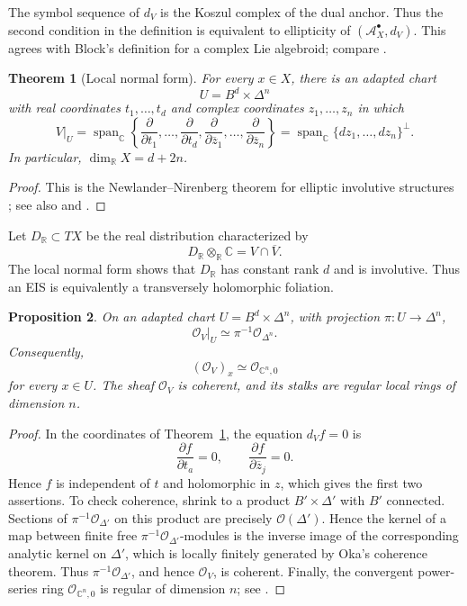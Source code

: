 \documentclass[12pt]{amsart}
\newtheorem{thm}{Theorem}[section]
\newtheorem{prop}[thm]{Proposition}
\theoremstyle{definition}
\theoremstyle{remark}
\numberwithin{equation}{section}
\newcommand{\CA}{\mathcal A}
\newcommand{\CO}{\mathcal O}
\newcommand{\C}{\mathbb C}
\newcommand{\R}{\mathbb R}
\newcommand{\Span}{\operatorname{span}}
\begin{document}
The symbol sequence of \(d_V\) is the Koszul complex of the dual anchor.
Thus the second condition in the definition is equivalent to ellipticity of
\((\CA_X^\bullet,d_V)\).  This agrees with Block's definition for a complex
Lie algebroid; compare \cite[Section~5.2]{Block2010}.

\begin{thm}[Local normal form]\label{thm:eis-normal-form}
For every \(x\in X\), there is an adapted chart
\[
U=B^d\times\Delta^n
\]
with real coordinates \(t_1,\ldots,t_d\) and complex coordinates
\(z_1,\ldots,z_n\) in which
\[
V|_U=
\Span_{\C}\left\{
\frac{\partial}{\partial t_1},\ldots,
\frac{\partial}{\partial t_d},
\frac{\partial}{\partial\overline z_1},\ldots,
\frac{\partial}{\partial\overline z_n}
\right\}
=\Span_{\C}\{dz_1,\ldots,dz_n\}^{\perp}.
\]
In particular, \(\dim_{\R}X=d+2n\).
\end{thm}

\begin{proof}
This is the Newlander--Nirenberg theorem for elliptic involutive structures
\cite[Theorem~5]{Korman2014}; see also
\cite[Chapter~VIII]{BCH2008} and \cite{Treves1992}.
\end{proof}

Let \(D_{\R}\subset TX\) be the real distribution characterized by
\[
D_{\R}\otimes_{\R}\C=V\cap\overline V.
\]
The local normal form shows that \(D_{\R}\) has constant rank \(d\) and is
involutive.  Thus an EIS is equivalently a transversely holomorphic
foliation.

\begin{prop}\label{prop:local-ring}
On an adapted chart \(U=B^d\times\Delta^n\), with projection
\(\pi:U\to\Delta^n\),
\[
\CO_V|_U\simeq\pi^{-1}\CO_{\Delta^n}.
\]
Consequently,
\[
(\CO_V)_x\simeq\CO_{\C^n,0}
\]
for every \(x\in U\).  The sheaf \(\CO_V\) is coherent, and its stalks are
regular local rings of dimension \(n\).
\end{prop}

\begin{proof}
In the coordinates of Theorem~\ref{thm:eis-normal-form}, the equation
\(d_Vf=0\) is
\[
\frac{\partial f}{\partial t_a}=0,
\qquad
\frac{\partial f}{\partial\overline z_j}=0.
\]
Hence \(f\) is independent of \(t\) and holomorphic in \(z\), which gives the
first two assertions.  To check coherence, shrink to a product
\(B'\times\Delta'\) with \(B'\) connected.  Sections of
\(\pi^{-1}\CO_{\Delta'}\) on this product are precisely
\(\CO(\Delta')\).  Hence the kernel of a map between finite free
\(\pi^{-1}\CO_{\Delta'}\)-modules is the inverse image of the corresponding
analytic kernel on \(\Delta'\), which is locally finitely generated by Oka's
coherence theorem.  Thus \(\pi^{-1}\CO_{\Delta'}\), and hence \(\CO_V\), is
coherent.  Finally, the convergent power-series ring
\(\CO_{\C^n,0}\) is regular of dimension \(n\); see
\cite{GrauertRemmert1984}.
\end{proof}
\end{document}
